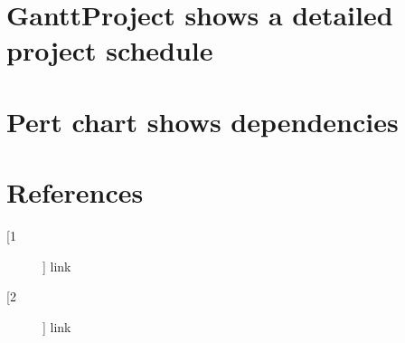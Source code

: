 \documentclass[12pt]{article}
\begin{document}
%
\section{GanttProject shows a detailed project schedule}

%
\section{Pert chart shows dependencies}

%
\section{References}
\begin{description}
  \item[[1]] link
  \item[[2]] link
\end{description}
\end{document}
